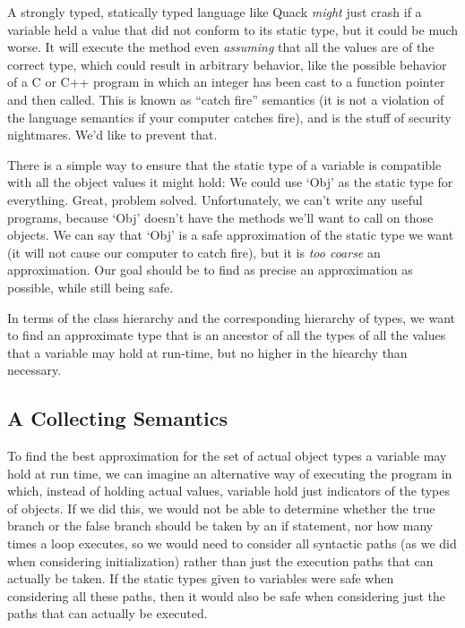 \documentclass[11pt]{article}
\begin{document}
A strongly typed, statically typed language like Quack \emph{might}
just crash if a variable held a value that did not conform to its
static type,  but it could be much
worse.  It will execute the method even \emph{assuming} that all the
values are of the correct type, which could result in arbitrary
behavior, like the possible behavior of a C or C++ program in which an
integer has been cast to a function pointer and then called.  This is
known as ``catch fire'' semantics (it is not a violation of the
language semantics if your computer catches fire), and is the stuff of
security nightmares.  We'd like to prevent that. 

There is a simple way to ensure that the static type of a variable is
compatible with all the object values it might hold:  We could use
`Obj' as the static type for everything.  Great, problem
solved. Unfortunately, we can't write any useful programs, because
`Obj' doesn't have the methods we'll want to call on those objects.
We can say that `Obj' is a safe approximation of the static type we
want (it will not cause our computer to catch fire), but it is
\emph{too coarse} an approximation.  Our goal should 
be to find as precise an approximation as possible, while still being
safe. 

In terms of the class hierarchy and the corresponding hierarchy of
types, we want to find an approximate type that is an ancestor of all
the types of all the values that a variable may hold at run-time, but
no higher in the hiearchy than necessary.  

\subsection{A Collecting Semantics}

To find the best approximation for the set of actual object types a
variable may hold at run time, we can imagine an alternative way of
executing the program in which, instead of holding actual values,
variable hold just indicators of the types of objects.  If we did
this, we would not be able to determine whether the true branch or the
false branch should be taken by an if statement, nor how many times a
loop executes, so we would need to consider all syntactic paths (as we
did when considering initialization) rather than just the execution
paths that can actually be taken.   If the static types given to
variables were safe when considering all these paths, then it would
also be safe when considering just the paths that can actually be
executed.  
\end{document}
